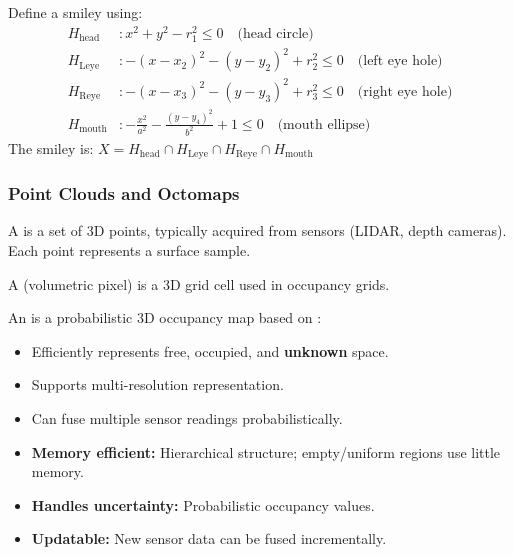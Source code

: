 \begin{exbox}
Define a smiley using:
\begin{align*}
H_{\text{head}}&: x^2 + y^2 - r_1^2 \leq 0 \quad \text{(head circle)} \\
H_{\text{Leye}}&: -(x-x_2)^2 - (y-y_2)^2 + r_2^2 \leq 0 \quad \text{(left eye hole)} \\
H_{\text{Reye}}&: -(x-x_3)^2 - (y-y_3)^2 + r_3^2 \leq 0 \quad \text{(right eye hole)} \\
H_{\text{mouth}}&: -\frac{x^2}{a^2} - \frac{(y-y_4)^2}{b^2} + 1 \leq 0 \quad \text{(mouth ellipse)}
\end{align*}
The smiley is: $X = H_{\text{head}} \cap H_{\text{Leye}} \cap H_{\text{Reye}} \cap H_{\text{mouth}}$
\end{exbox}

\separator

\subsubsection{Point Clouds and Octomaps}

\begin{defbox}
A  is a set of 3D points, typically acquired from sensors (LIDAR, depth cameras). Each point represents a surface sample.
\end{defbox}

\begin{defbox}[Voxel]
A  (volumetric pixel) is a 3D grid cell used in occupancy grids.
\end{defbox}

\begin{defbox}[Octomap]
An  is a probabilistic 3D occupancy map based on :
\begin{itemize}
  \item Efficiently represents free, occupied, and \textbf{unknown} space.
  \item Supports multi-resolution representation.
  \item Can fuse multiple sensor readings probabilistically.
\end{itemize}
\end{defbox}

\begin{tipbox}
\begin{itemize}
  \item \textbf{Memory efficient:} Hierarchical structure; empty/uniform regions use little memory.
  \item \textbf{Handles uncertainty:} Probabilistic occupancy values.
  \item \textbf{Updatable:} New sensor data can be fused incrementally.
\end{itemize}
\end{tipbox}

